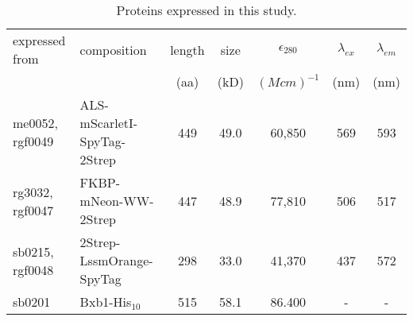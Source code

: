 
\begin{table}[htp]

  \parbox{1.0\columnwidth}{\caption[Protein properties]{\label{stab:proteins}
      Proteins expressed in this study.}}

  \renewcommand{\arraystretch}{1.2}  %

  \begin{tabular*}{1.0\columnwidth}{llccccc}

    \toprule
    expressed from &
    composition &
    length &
    size &
    $\epsilon_{280}$ &
    $\lambda_{ex}$ &
    $\lambda_{em}$ 
    \\
    &
    &
    (aa) &
    (kD) &
    $(M cm)^{-1}$&
    (nm) &
    (nm)
    \\
    \midrule


    me0052, rgf0049 & ALS-mScarletI-SpyTag-2Strep &
    449 & 49.0 & 60,850 & 569 & 593 \\

    rg3032, rgf0047 & FKBP-mNeon-WW-2Strep &
    447 & 48.9 & 77,810 & 506 & 517 \\

    sb0215, rgf0048 & 2Strep-LssmOrange-SpyTag &
    298 & 33.0 & 41,370 & 437 & 572 \\

    sb0201 & Bxb1-His$_{10}$ &
    515 & 58.1 & 86.400 & - & - \\


    \bottomrule 
    \bottomrule

  \end{tabular*}
\end{table}

